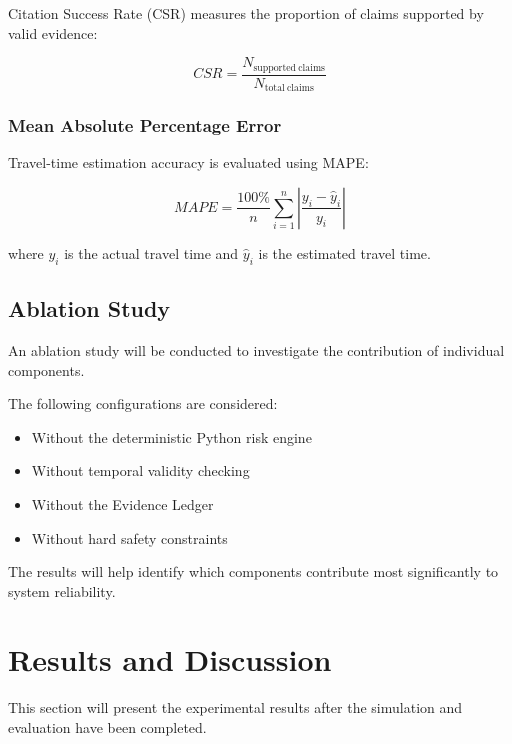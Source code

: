 \documentclass[conference]{IEEEtran}
\begin{document}
Citation Success Rate (CSR) measures the proportion of claims
supported by valid evidence:

\begin{equation}
CSR =
\frac{N_{\mathrm{supported\ claims}}}
{N_{\mathrm{total\ claims}}}
\label{eq:csr}
\end{equation}

\subsubsection{Mean Absolute Percentage Error}

Travel-time estimation accuracy is evaluated using MAPE:

\begin{equation}
MAPE =
\frac{100\%}{n}
\sum_{i=1}^{n}
\left|
\frac{y_i-\hat{y}_i}{y_i}
\right|
\label{eq:mape}
\end{equation}

where $y_i$ is the actual travel time and $\hat{y}_i$
is the estimated travel time.

\subsection{Ablation Study}

An ablation study will be conducted to investigate the
contribution of individual components.

The following configurations are considered:

\begin{itemize}
    \item Without the deterministic Python risk engine
    \item Without temporal validity checking
    \item Without the Evidence Ledger
    \item Without hard safety constraints
\end{itemize}

The results will help identify which components contribute
most significantly to system reliability.

\section{Results and Discussion}

This section will present the experimental results after
the simulation and evaluation have been completed.
\end{document}
